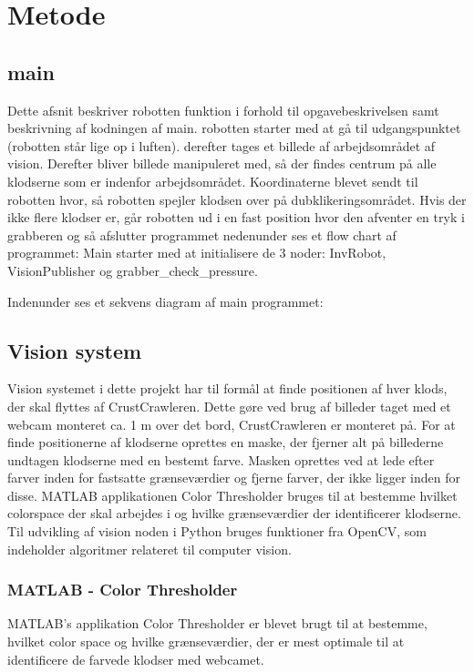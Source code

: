 \chapter{Metode}\label{chap:Metode}
\section{main}
Dette afsnit beskriver robotten funktion i forhold til opgavebeskrivelsen samt beskrivning af kodningen af main.
robotten starter med at gå til udgangspunktet (robotten står lige op i luften). derefter tages et billede af arbejdsområdet af vision.
Derefter bliver billede manipuleret med, så der findes centrum på alle klodserne som er indenfor arbejdsområdet. Koordinaterne blevet sendt til robotten hvor, så robotten spejler klodsen over på dubklikeringsområdet. Hvis der ikke flere klodser er, går robotten ud i en fast position hvor den afventer en tryk i grabberen
og så afslutter programmet \newline
nedenunder ses et flow chart af programmet:
Main starter med at initialisere de 3 noder: InvRobot, VisionPublisher og grabber\_check\_pressure.


Indenunder ses et sekvens diagram af main programmet:

\section{Vision system}
Vision systemet i dette projekt har til formål at finde positionen af hver klods, der skal flyttes af CrustCrawleren.
Dette gøre ved brug af billeder taget med et webcam monteret ca. 1 m over det bord, CrustCrawleren er monteret på.
For at finde positionerne af klodserne oprettes en maske, der fjerner alt på billederne undtagen klodserne med en bestemt farve.
Masken oprettes ved at lede efter farver inden for fastsatte grænseværdier og fjerne farver, der ikke ligger inden for disse.
MATLAB applikationen Color Thresholder bruges til at bestemme hvilket colorspace der skal arbejdes i og hvilke grænseværdier der identificerer klodserne.
Til udvikling af vision noden i Python bruges funktioner fra OpenCV, som indeholder algoritmer relateret til computer vision.

\subsection{MATLAB - Color Thresholder}
MATLAB's  applikation Color Thresholder er blevet brugt til at bestemme, hvilket color space og hvilke grænseværdier, der er mest optimale til at identificere de farvede klodser med webcamet.

